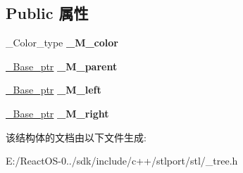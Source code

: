 \subsection*{Public 属性}
\begin{DoxyCompactItemize}
\item 
\mbox{\label{struct___rb__tree__node__base_abdf0bcfb141ef21995a445b04a2131de}} 
\+\_\+\+Color\+\_\+type {\bfseries \+\_\+\+M\+\_\+color}
\item 
\mbox{\label{struct___rb__tree__node__base_a02ac40258de91d0dd1c43a506ad21015}} 
\hyperlink{struct___rb__tree__node__base}{\+\_\+\+Base\+\_\+ptr} {\bfseries \+\_\+\+M\+\_\+parent}
\item 
\mbox{\label{struct___rb__tree__node__base_a8250e590a9cdbcca38065fb223193311}} 
\hyperlink{struct___rb__tree__node__base}{\+\_\+\+Base\+\_\+ptr} {\bfseries \+\_\+\+M\+\_\+left}
\item 
\mbox{\label{struct___rb__tree__node__base_a60580863cd1c618be36f7873f4288371}} 
\hyperlink{struct___rb__tree__node__base}{\+\_\+\+Base\+\_\+ptr} {\bfseries \+\_\+\+M\+\_\+right}
\end{DoxyCompactItemize}


该结构体的文档由以下文件生成\+:\begin{DoxyCompactItemize}
\item 
E\+:/\+React\+O\+S-\/0../sdk/include/c++/stlport/stl/\+\_\+tree.\+h\end{DoxyCompactItemize}
